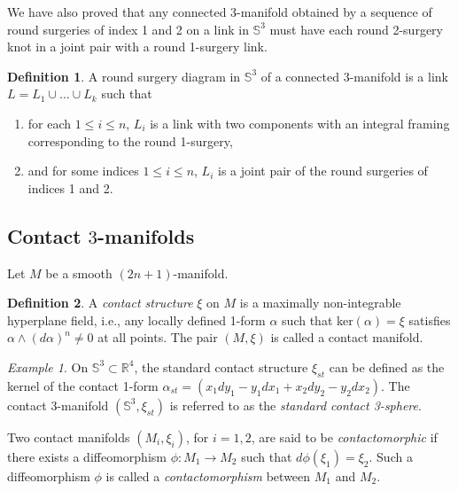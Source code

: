 \documentclass{amsart}
\theoremstyle{plain}
\theoremstyle{remark}
\newtheorem{rem}{Remark}
\newtheorem{exm}{Example}
\theoremstyle{definition}
\newtheorem{defn}{Definition}
\newcommand{\s}{\mathbb{S}}
\begin{document}
We have also proved that any connected 3-manifold obtained by a sequence of round surgeries of index 1 and 2 on a link in $\s^3$ must have each round 2-surgery knot in a joint pair with a round 1-surgery link.


\begin{defn}
A round surgery diagram in $\mathbb{S}^3$ of a connected 3-manifold is a link $L=L_{1} \cup \ldots \cup L_{k}$ such that 
    \begin{enumerate}
        \item for each $1\leq i\leq n$, $L_i$ is a link with two components with an integral framing corresponding to the round 1-surgery,
        \item and for some indices $1 \leq i \leq n$, $L_i$ is a joint pair of the round surgeries of indices 1 and 2. 
    \end{enumerate}
\end{defn}


    
\subsection{Contact $3$-manifolds}
Let $M$ be a smooth $(2n+1)$-manifold. 
\begin{defn}
    A {\it contact structure} $\xi$ on $M$ is a maximally non-integrable hyperplane field, i.e., any locally defined 1-form $\alpha$ such that ker$(\alpha)= \xi$ satisfies $\alpha \wedge (d\alpha)^n \neq 0$ at all points. The pair $(M,\xi)$ is called a contact manifold.
\end{defn}

\begin{exm}
On $\mathbb{S}^3 \subset \mathbb{R}^4$, the standard contact structure $\xi_{st}$ can be defined as the kernel of the contact 1-form $\alpha_{st}=\left( x_1dy_1-y_1dx_1+ x_2dy_2-y_2dx_2\right)$.
The contact 3-manifold $\left(\s^3, \xi_{st}\right)$ is referred to as the {\it standard contact 3-sphere}. 
\end{exm}


Two contact manifolds $(M_i, \xi_i)$, for $i=1,2$, are said to be {\it contactomorphic} if there exists a diffeomorphism $\phi: M_1 \to M_2$ such that $d\phi(\xi_1)= \xi_2$. 
Such a diffeomorphism $\phi$ is called a {\it contactomorphism} between $M_1$ and $M_2$. 
\end{document}
